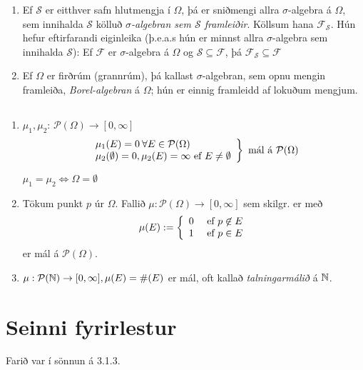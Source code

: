 \documentclass[12pt]{book}
\newcommand{\cP}{\mathcal{P}}
\newcommand{\cF}{\mathcal{F}}
\newcommand{\cS}{\mathcal{S}}
\begin{document}
\begin{enumerate}
\item Ef $\cS$ er eitthver safn hlutmengja í $\Omega$, þá er sniðmengi allra $\sigma$-algebra á $\Omega$, sem
  innihalda $\cS$ kölluð \emph{$\sigma$-algebran sem $\cS$ framleiðir}.
  Köllsum hana $\cF_{\cS}$. Hún hefur eftirfarandi eiginleika (þ.e.a.s hún er minnst allra
  $\sigma$-algebra sem innihalda $\cS$): Ef $\cF$ er $\sigma$-algebra á $\Omega$ og $\cS \subseteq \cF$, þá
  $\cF_{\cS} \subseteq \cF$


\item  Ef $\Omega$ er firðrúm (grannrúm), þá kallast $\sigma$-algebran, sem opnu mengin framleiða,
  \emph{Borel-algebran} á $\Omega$; hún er einnig framleidd af lokuðum mengjum.
\end{enumerate}

\subsection{}

\begin{daemi}
  \begin{enumerate}[\arabic*.]
  \item $\mu_1, \mu_2$: $\cP(\Omega) \to [0, \infty]$
    \[ \left. \begin{array}{l}
                \mu_1 (E) = 0 \: \forall E \in \cP(\Omega)\\
                \mu_2 (\emptyset) = 0, \mu_2(E) = \infty \Ef E \neq \emptyset \\
                \end{array}
                \right\} \text{ mál á $\cP(\Omega)$}
                \]
              \begin{ath}
                $\mu_1 = \mu_2 \Leftrightarrow \Omega = \emptyset$
              \end{ath}


            \item Tökum punkt $p$ úr $\Omega$. Fallið $\mu: \cP(\Omega) \to [0,\infty]$
sem skilgr. er með \[ \mu(E) := \left\{ \begin{array}{l l} 0 & \text{ ef } p \not\in E\\ 1 & \text{ ef } p \in E \end{array} \right. \]
er mál á $\cP(\Omega)$.
\item $\mu: \cP(\N) \to [0, \infty], \mu(E) = \#(E)$ er mál, oft kallað \emph{talningarmálið} á $\mathbb{N}$.
              \end{enumerate}

  
\end{daemi}

\section{Seinni fyrirlestur}

Farið var í sönnun á 3.1.3.

 
\end{document}
